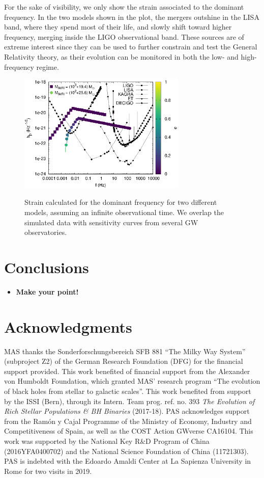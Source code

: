 \documentclass[useAMS,usenatbib]{mn2e}
\begin{document}
For the sake of visibility, we only show the strain associated to the dominant frequency. In the two models shown in the plot, the mergers outshine in the LISA band, where they spend most of their life, and slowly shift toward higher frequency, merging inside the LIGO observational band. These sources are of extreme interest since they can be used to further constrain and test the General Relativity theory, as their evolution can be monitored in both the low- and high-frequency regime. 

\begin{figure}
\centering
\includegraphics[width=8cm]{example_signal}\\
\caption{Strain calculated for the dominant frequency for two different models, assuming an infinite observational time. We overlap the simulated data with sensitivity curves from several GW observatories.}
\label{F12}
\end{figure}

\section{Conclusions}

\begin{itemize}
\item {\bf Make your point!}
\end{itemize}

\section*{Acknowledgments}

MAS thanks the Sonderforschungsbereich SFB 881 ``The Milky Way System''
(subproject Z2) of the German Research Foundation (DFG) for the financial
support provided. This work benefited of financial support from the Alexander
von Humboldt Foundation, which granted MAS' research program ``The evolution of
black holes from stellar to galactic scales''.  This work benefited from
support by the ISSI (Bern), through its Intern. Team prog. ref. no. 393 {\it
The Evolution of Rich Stellar Populations \& BH Binaries} (2017-18).  PAS
acknowledges support from the Ram{\'o}n y Cajal Programme of the Ministry of
Economy, Industry and Competitiveness of Spain, as well as the COST Action
GWverse CA16104. This work was supported by the National Key R\&D Program of
China (2016YFA0400702) and the National Science Foundation of China (11721303).
PAS is indebted with the Edoardo Amaldi Center at La Sapienza University in
Rome for two visits in 2019.


\label{LastPage}
\end{document}
